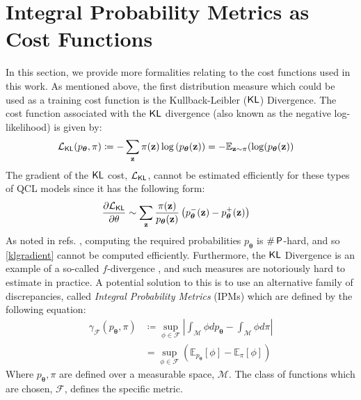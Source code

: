 \section{Integral Probability Metrics as Cost Functions}
\label{supp_matt:cf_and_ipms}

In this section, we provide more formalities relating to the cost functions used in this work.
As mentioned above, the first distribution measure which could be used as a training cost function is the Kullback-Leibler ($\operatorname{\textsf{KL}}$) Divergence. The cost function associated with the $\operatorname{\textsf{KL}}$ divergence (also known as the negative log-likelihood) is given by:
\begin{align}
    &\mathcal{L}_{\operatorname{\textsf{KL}}}(p_{\boldsymbol\theta}, \pi) \coloneqq -\sum\limits_{\mathbf{z}} \pi(\mathbf{z})\log\left(p_{\boldsymbol\theta}(\mathbf{z})\right)  = -\mathbb{E}_{\mathbf{z}\sim\pi}(\log(p_{\boldsymbol\theta}(\mathbf{z}))\label{klcostfunction}
\end{align}
The gradient of the $\operatorname{\textsf{KL}}$ cost, $\mathcal{L}_{\operatorname{\textsf{KL}}}$, cannot be estimated efficiently for these types of QCL models since it has the following form:
\begin{align}
\frac{\partial\mathcal{L}_{\operatorname{\textsf{KL}}}}{\partial \theta} 
& \sim \sum\limits_{\mathbf{z}}\frac{\pi(\mathbf{z})}{{p_{\boldsymbol\theta}(\mathbf{z})}}\left(p^-_{\boldsymbol\theta}(\mathbf{z})- p^+_{\boldsymbol\theta}(\mathbf{z})\right) \label{klgradient}
\end{align}
As noted in refs. , computing the required probabilities $p_{\boldsymbol\theta}$ is $\#\operatorname{\textsf{P}}$-hard, and so \eqref{klgradient} cannot be computed efficiently.
Furthermore, the $\operatorname{\textsf{KL}}$ Divergence is an example of a so-called $f$-divergence , and such measures are notoriously hard to estimate in practice. A potential solution to this is to use an alternative family of discrepancies, called \textit{Integral Probability Metrics} (IPMs) which are defined by the following equation:
\begin{align}
    \gamma_{\mathcal{F}}(p_{\boldsymbol\theta}, \pi) &  \coloneqq \sup_{\phi \in \mathcal{F}}\left|\int_{\mathcal{M}}\phi dp_{\boldsymbol\theta}-\int_{\mathcal{M}}\phi d\pi\right| \label{ipmequation}\\
    &= \sup_{\phi \in \mathcal{F}}\left(\mathbb{E}_{p_{\boldsymbol\theta}}[\phi]- \mathbb{E}_{\pi}[\phi]\right) 
\end{align}
Where $p_{\boldsymbol\theta}, \pi$ are defined over a measurable space, $\mathcal{M}$. The class of functions which are chosen, $\mathcal{F}$, defines the specific metric.

